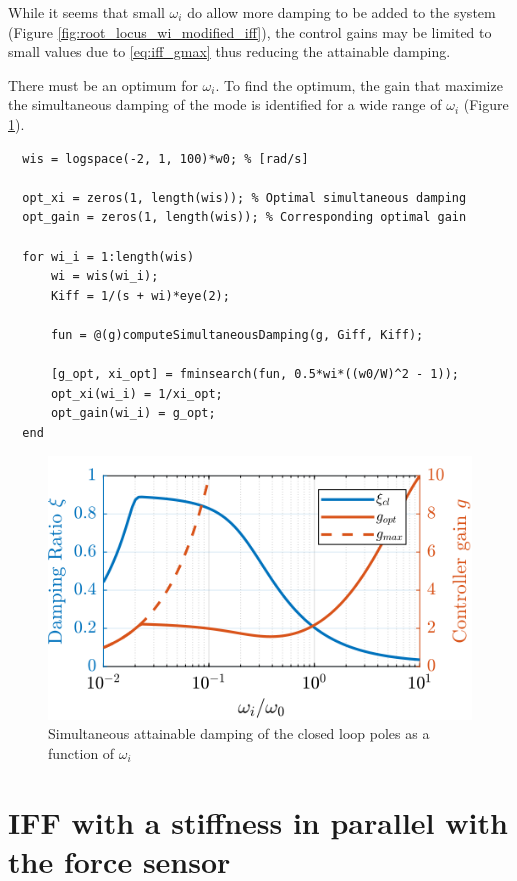 \documentclass[a4paper, 10pt, DIV=12, parskip=full]{scrreprt}
\begin{document}
While it seems that small \(\omega_i\) do allow more damping to be added to the system (Figure \ref{fig:root_locus_wi_modified_iff}), the control gains may be limited to small values due to \eqref{eq:iff_gmax} thus reducing the attainable damping.

There must be an optimum for \(\omega_i\).
To find the optimum, the gain that maximize the simultaneous damping of the mode is identified for a wide range of \(\omega_i\) (Figure \ref{fig:mod_iff_damping_wi}).

\begin{verbatim}
  wis = logspace(-2, 1, 100)*w0; % [rad/s]

  opt_xi = zeros(1, length(wis)); % Optimal simultaneous damping
  opt_gain = zeros(1, length(wis)); % Corresponding optimal gain

  for wi_i = 1:length(wis)
      wi = wis(wi_i);
      Kiff = 1/(s + wi)*eye(2);

      fun = @(g)computeSimultaneousDamping(g, Giff, Kiff);

      [g_opt, xi_opt] = fminsearch(fun, 0.5*wi*((w0/W)^2 - 1));
      opt_xi(wi_i) = 1/xi_opt;
      opt_gain(wi_i) = g_opt;
  end
\end{verbatim}

\begin{figure}[htbp]
\centering
\includegraphics[scale=1]{figs/mod_iff_damping_wi.png}
\caption{\label{fig:mod_iff_damping_wi}Simultaneous attainable damping of the closed loop poles as a function of \(\omega_i\)}
\end{figure}

\chapter{IFF with a stiffness in parallel with the force sensor}
\label{sec:orgc5ba04a}
\label{sec:iff_parallel_stiffness}
\end{document}
